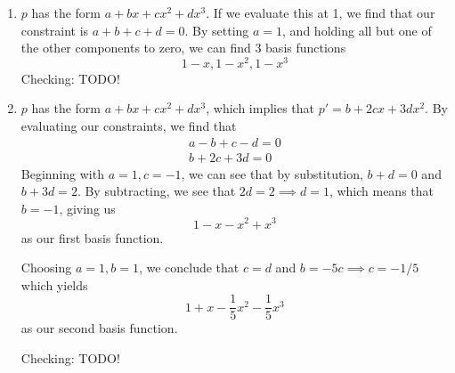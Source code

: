 \documentclass[]{article}
\begin{document}
\begin{enumerate}[resume]
\begin{enumerate}
      \item $p$ has the form $a + bx + cx^2 + dx^3$. If we evaluate
        this at 1, we find that our constraint is $a + b + c + d =
        0$. By setting $a = 1$, and holding all but one of the other
        components to zero, we can find 3 basis functions
        \[
          1 - x, 1 - x^2, 1 - x^3
        \]
        Checking: TODO!
        
	  \item $p$ has the form $a + bx + cx^2 + dx^3$, which implies
        that $p' = b + 2cx + 3dx^2$. By evaluating our constraints, we
        find that
        \begin{gather*}
          a - b + c - d = 0 \\
          b + 2c + 3d = 0
        \end{gather*}
        Beginning with $a = 1, c = -1$, we can see that by
        substitution, $b + d = 0$ and $b + 3d = 2$. By subtracting, we
        see that $2d = 2 \implies d = 1$, which means that $b = -1$,
        giving us
        \[
        1 - x - x^2 + x^3
        \]
        as our first basis function.

        Choosing $a = 1, b = 1$, we conclude that $c = d$ and $b = -5c
        \implies c = -1/5$ which yields
        \[
        1 + x - \frac{1}{5}x^2 - \frac{1}{5}x^3
        \]
        as our second basis function.

        Checking: TODO!
        
	  \end{enumerate}
    \end{enumerate}
\end{document}
